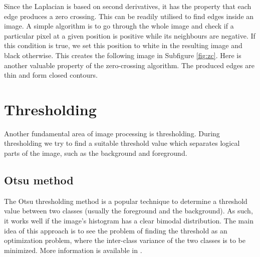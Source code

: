 \documentclass[
  digital,     %
  oneside,     %
  nosansbold,  %
  nocolorbold, %
  lof,         %
  lot,         %
]{fithesis4}
\begin{document}
Since the Laplacian is based on second derivatives, it has the property that
each edge produces a zero crossing. This can be readily utilised to find edges
inside an image. A simple algorithm is to go through the whole image and check
if a particular pixel at a given position is positive while its neighbours are
negative. If this condition is true, we set this position to white in the
resulting image and black otherwise. This creates the following image in
Subfigure \ref{fig:zc}. Here is another valuable property of the zero-crossing
algorithm. The produced edges are thin and form closed contours.

\section{Thresholding}

Another fundamental area of image processing is thresholding. During thresholding
we try to find a suitable threshold value which separates logical parts of the image,
such as the background and foreground.

\subsection{Otsu method}

The Otsu thresholding method is a popular technique to determine a threshold
value between two classes (usually the foreground and the background). As such,
it works well if the image's histogram has a clear bimodal distribution. The
main idea of this approach is to see the problem of finding the threshold as an
optimization problem, where the inter-class variance of the two classes is to be
minimized. More information is available in \cite{otsu1979}.
\end{document}
